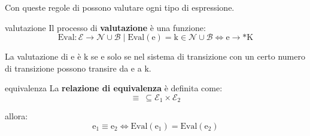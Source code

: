 Con queste regole di possono valutare ogni tipo di espressione.

\begin{mydef}{valutazione}
    Il processo di \textbf{valutazione} è una funzione:
    \[
        \mathrm{Eval}: \mathcal{E} \rightarrow \mathcal{N} \cup \mathcal{B} \mid \mathrm{Eval(e)} = \mathrm{k} \in \mathcal{N} \cup \mathcal{B} \Leftrightarrow \mathrm{e} \rightarrow *\mathrm{K}
    \]

    La valutazione di $\mathrm{e}$ è $\mathrm{k}$ se e solo se nel sistema di transizione con un certo numero di transizione possono transire da $\mathrm{e}$ a $\mathrm{k}$.
\end{mydef}

\begin{mydef}{equivalenza}
    La \textbf{relazione di equivalenza} è definita come:
    \[
        \equiv \ \subseteq \mathcal{E}_1 \times \mathcal{E}_2
    \]

    allora:
    \[
        \mathrm{e}_1 \equiv \mathrm{e}_2 \Leftrightarrow \mathrm{Eval(e_1)} = \mathrm{Eval(e_2)}
    \]
\end{mydef}